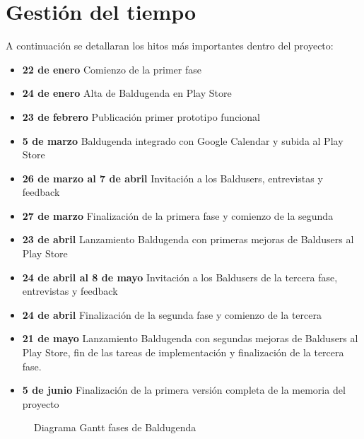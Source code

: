 \section{Gestión del tiempo}
\label{secc:Gestión del tiempo}

A continuación se detallaran los hitos más importantes dentro del proyecto:

\begin{itemize}
	\item \textbf{22 de enero} Comienzo de la primer fase
	\item \textbf{24 de enero} Alta de Baldugenda en Play Store
	\item \textbf{23 de febrero} Publicación primer prototipo funcional
	\item \textbf{5 de marzo} Baldugenda integrado con Google Calendar y subida al Play Store
	\item \textbf{26 de marzo al 7 de abril} Invitación a los Baldusers, entrevistas y feedback
	\item \textbf{27 de marzo} Finalización de la primera fase y comienzo de la segunda
	\item \textbf{23 de abril} Lanzamiento Baldugenda con primeras mejoras de Baldusers al Play Store
	\item \textbf{24 de abril al 8 de mayo} Invitación a los Baldusers de la tercera fase, entrevistas y feedback
	\item \textbf{24 de abril} Finalización de la segunda fase y comienzo de la tercera
	\item \textbf{21 de mayo} Lanzamiento Baldugenda con segundas mejoras de Baldusers al Play Store, fin de las tareas de implementación y finalización de la tercera fase.
	\item \textbf{5 de junio} Finalización de la primera versión completa de la memoria del proyecto
\end{itemize}

\begin{figure}[H] 
  \begin{center} 
    \caption{Diagrama Gantt fases de Baldugenda} 
    \label{fig:hitos} 
  \end{center} 
\end{figure}